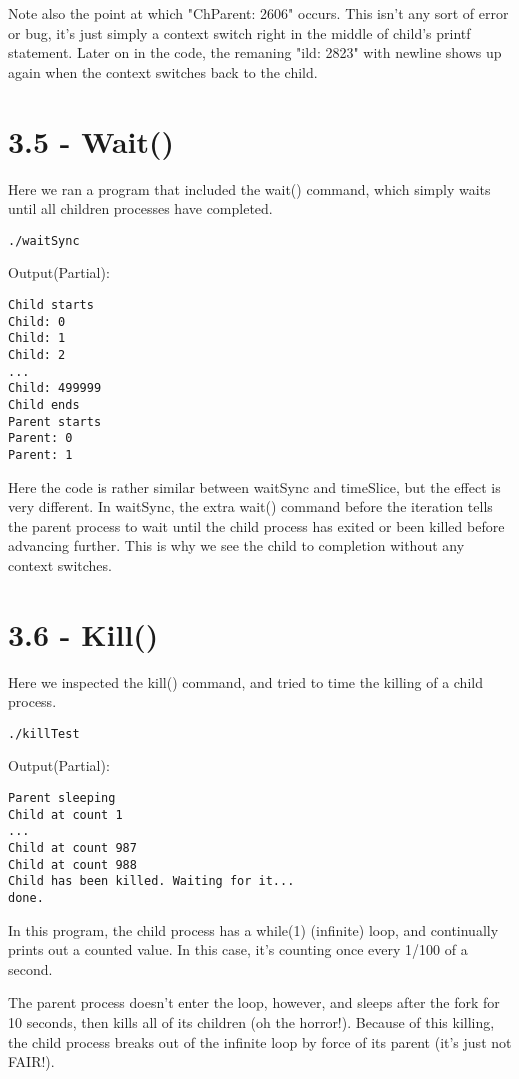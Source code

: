 \documentclass[11pt]{report}
\begin{document}
Note also the point at which "ChParent: 2606" occurs. This isn't any sort of error or bug, it's just simply a context switch right in the middle of child's printf statement. Later on in the code, the remaning "ild: 2823" with newline shows up again when the context switches back to the child.

\newpage
\section*{3.5 - Wait()}
Here we ran a program that included the wait() command, which simply waits until all children processes have completed.

\begin{verbatim}
./waitSync
\end{verbatim}

Output(Partial):
\begin{verbatim}
Child starts
Child: 0
Child: 1
Child: 2
...
Child: 499999
Child ends
Parent starts
Parent: 0
Parent: 1
\end{verbatim}

Here the code is rather similar between waitSync and timeSlice, but the effect is very different. In waitSync, the extra wait() command before the iteration tells the parent process to wait until the child process has exited or been killed before advancing further. This is why we see the child to completion without any context switches.

\section*{3.6 - Kill()}
Here we inspected the kill() command, and tried to time the killing of a child process.

\begin{verbatim}
./killTest
\end{verbatim}

Output(Partial):
\begin{verbatim}
Parent sleeping
Child at count 1
...
Child at count 987
Child at count 988
Child has been killed. Waiting for it...
done.
\end{verbatim}


In this program, the child process has a while(1) (infinite) loop, and continually prints out a counted value. In this case, it's counting once every 1/100 of a second.

The parent process doesn't enter the loop, however, and sleeps after the fork for 10 seconds, then kills all of its children (oh the horror!). Because of this killing, the child process breaks out of the infinite loop by force of its parent (it's just not FAIR!).
\end{document}
